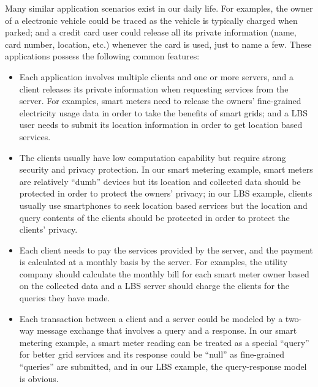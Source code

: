 \documentclass[letterpaper,12pt]{article}
\begin{document}
Many similar application scenarios exist in our daily life. For examples, the owner of a electronic vehicle could be traced as the vehicle is typically charged when parked; and a credit card user could release all its private information (name, card number, location, etc.) whenever the card is used, just to name a few. These applications possess the following common features:
\begin{itemize}
\item Each application involves multiple clients and one or more servers, and a client releases its private information when requesting services from the server. For examples, smart meters need to release the owners' fine-grained electricity usage data in order to take the benefits of smart grids; and a LBS user needs to submit its location information in order to get location based services.
\item The clients usually have low computation capability but require strong security and privacy protection. In our smart metering example, smart meters are relatively ``dumb'' devices but its location and collected data should be protected in order to protect the owners' privacy; in our LBS example, clients usually use smartphones to seek location based services but the location and query contents of the clients should be protected in order to protect the clients' privacy.
\item Each client needs to pay the services provided by the server, and the payment is calculated at a monthly basis by the server. For examples, the utility company should calculate the monthly bill for each smart meter owner based on the collected data and a LBS server should charge the clients for the queries they have made.
\item Each transaction between a client and a server could be modeled by a two-way message exchange that involves a query and a response. In our smart metering example, a smart meter reading can be treated as a special ``query'' for better grid services and its response could be ``null'' as fine-grained ``queries'' are submitted, and in our LBS example, the query-response model is obvious.
\end{itemize}
\end{document}
